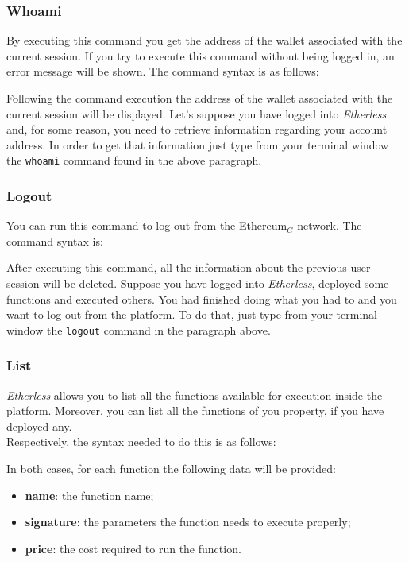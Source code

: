 \subsubsection{Whoami}
By executing this command you get the address of the wallet associated with the current session. If you try to execute this command without being logged in, an error message will be shown. The command syntax is as follows: 
\begin{center}
\end{center}
Following the command execution the address of the wallet associated with the current session will be displayed.
Let's suppose you have logged into \textit{Etherless} and, for some reason, you need to retrieve information regarding your account address. In order to get that information just type from your terminal window the \texttt{whoami} command found in the above paragraph.

\subsubsection{Logout}
You can run this command to log out from the Ethereum$_{G}$ network. The command syntax is:
\begin{center}
\end{center}
After executing this command, all the information about the previous user session will be deleted.
Suppose you have logged into \textit{Etherless}, deployed some functions and executed others. You had finished doing what you had to and you want to log out from the platform. To do that, just type from your terminal window the \texttt{logout} command in the paragraph above.

\subsubsection{List}\label{list}
\textit{Etherless} allows you to list all the functions available for execution inside the platform. Moreover, you can list all the functions of you property, if you have deployed any. \\
Respectively, the syntax needed to do this is as follows:
\begin{center}
\end{center}
\noindent In both cases, for each function the following data will be provided:
\begin{itemize}
	\item \textbf{name}: the function name;
	\item \textbf{signature}: the parameters the function needs to execute properly;
	\item \textbf{price}: the cost required to run the function.
\end{itemize}

